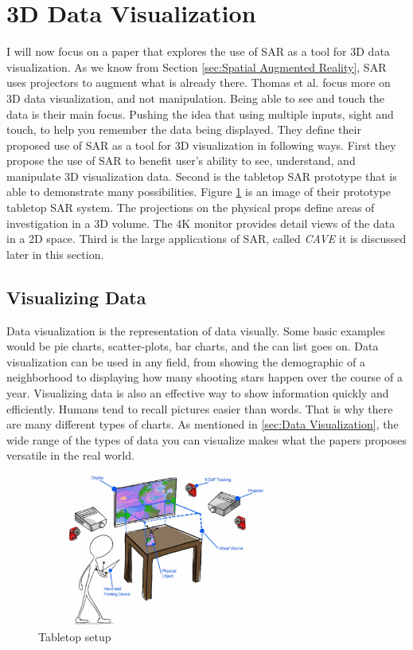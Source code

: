 \documentclass{sig-alternate}
\begin{document}
\section{3D Data Visualization}
\label{sec:3D Data Visualization}
I will now focus on a paper that explores the use of SAR as a tool for 3D data visualization. As we know from Section \ref{sec:Spatial Augmented Reality}, SAR uses projectors to augment what is already there. Thomas et al. \cite{3D} focus more on 3D data visualization, and not manipulation. Being able to see and touch the data is their main focus. Pushing the idea that using multiple inputs, sight and touch, to help you remember the data being displayed. They \cite{3D} define their proposed use of SAR as a tool for 3D visualization in following ways. First they propose the use of SAR to benefit user's ability to see, understand, and manipulate 3D visualization data. Second is the tabletop SAR prototype that is able to demonstrate many possibilities. Figure \ref{fig:Tabletop}  is an image of their prototype tabletop SAR system. The projections on the physical props define areas of investigation in a 3D volume. The 4K monitor provides detail views of the data in a 2D space. Third is the large applications of SAR, called \textit{CAVE} it is discussed later in this section.


\subsection{Visualizing Data}
\label{sec:Visualizing Data}
Data visualization is the representation of data visually. Some basic examples would be pie charts, scatter-plots, bar charts, and the can list goes on. Data visualization can be used in any field, from showing the demographic of a neighborhood to displaying how many shooting stars happen over the course of a year. Visualizing data is also an effective way to show information quickly and efficiently. Humans tend to recall pictures easier than words. That is why there are many different types of charts. As mentioned in \ref{sec:Data Visualization}, the wide range of the types of data you can visualize makes what the papers proposes versatile in the real world.      


\begin{figure}
	\includegraphics[width=8.5cm, height=5cm]{Tabletop}
	\caption{Tabletop setup \cite{3D}}
	\label{fig:Tabletop}
\end{figure}
\end{document}
